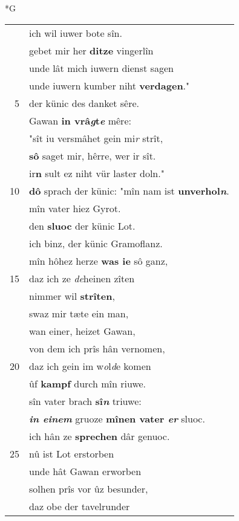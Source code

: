 \documentclass[8pt,a4paper,notitlepage]{article}
\begin{document}
\newpage
\begin{table}[ht]
\begin{minipage}[t]{0.5\linewidth}
\small
\begin{center}*G
\end{center}
\begin{tabular}{rl}
 & ich wil iuwer bote sîn.\\ 
 & gebet mir her \textbf{ditze} vingerlîn\\ 
 & unde lât mich iuwern dienst sagen\\ 
 & unde iuwern kumber niht \textbf{verdagen}."\\ 
5 & der künic des danket sêre.\\ 
 & Gawan \textbf{in vrâ\textit{g}t\textit{e}} mêre:\\ 
 & "sît iu versmâhet gein mi\textit{r} strît,\\ 
 & \textbf{sô} saget mir, hêrre, wer ir sît.\\ 
 & ir\textbf{n} sult ez niht vür laster doln."\\ 
10 & \textbf{dô} sprach der künic: "mîn nam ist \textbf{unverhol\textit{n}}.\\ 
 & mîn vater hiez Gyrot.\\ 
 & den \textbf{sluoc} der künic Lot.\\ 
 & ich binz, der künic Gramoflanz.\\ 
 & mîn hôhez herze \textbf{was ie} sô ganz,\\ 
15 & daz ich ze \textit{de}heinen zîten\\ 
 & nimmer wil \textbf{strîten},\\ 
 & swaz mir tæte ein man,\\ 
 & wan einer, heizet Gawan,\\ 
 & von dem ich prîs hân vernomen,\\ 
20 & daz ich gein im w\textit{o}l\textit{d}e komen\\ 
 & ûf \textbf{kampf} durch mîn riuwe.\\ 
 & sîn vater brach \textbf{sî\textit{n}} triuwe:\\ 
 & \textit{\textbf{in einem}} gruoze \textbf{mînen vater \textit{er}} sluoc.\\ 
 & ich hân ze \textbf{sprechen} dâr genuoc.\\ 
25 & nû ist Lot erstorben\\ 
 & unde hât Gawan erworben\\ 
 & solhen prîs vor ûz besunder,\\ 
 & daz obe der tavelrunder\\ 

\end{tabular}
\end{minipage}
\end{table}
\end{document}
